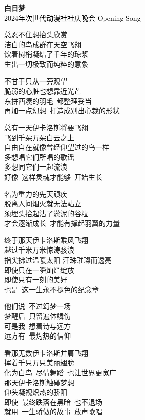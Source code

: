 \newpage  %
\vspace{3em}
\begin{center}
    \fontsize{25pt}{27pt}\selectfont
    \textbf{\textcolor{truepurple}{白日梦}}  %
    \\[0ex]  %
    \fontsize{15pt}{17pt}\selectfont
    \textcolor{black}{2024年次世代动漫社社庆晚会 Opening Song}  %
\end{center}
\flushleft  %
\vspace{2em}
\begin{multicols}{2} 
总忍不住想抬头欣赏\\
洁白的鸟成群在天空飞翔\\
饮着树梢凝结了千年的琼浆\\
生出一切极致而纯粹的意象

\vspace{1em}
不甘于只从一旁观望\\
脆弱的心脏也想靠近光芒\\
东拼西凑的羽毛~都整理妥当\\
再加一点幻想~打造成别出心裁的形状

\vspace{1em}
总有一天伊卡洛斯将要飞翔\\
飞到千朵万朵白云之上\\
自由自在就像曾经仰望过的鸟一样\\
多想唱它们所唱的歌谣\\
多想同它们一起流浪\\
好像~这样灵魂才能够~开始生长 

\vspace{1em}
名为重力的先天顽疾\\
脱离人间烟火就无法站立\\
须埋头拾起沾了淤泥的谷粒\\
才会逐渐成长~才能有撑起羽翼的力量

\vspace{1em}
终于那天伊卡洛斯乘风飞翔\\
越过千米万米惊涛骇浪\\
指尖拂过温暖太阳 汗珠璀璨而透亮\\
即使只在一瞬灿烂绽放\\
即使只有一刻的美好\\
也是~这一生永不褪色的纪念章

\vspace{1em}
他们说~不过幻梦一场\\
梦醒后~只留遍体鳞伤\\
可是我~想着诗与远方\\
远方有~最灼热的信仰

\vspace{1em}
看那无数伊卡洛斯并肩飞翔\\
挥着千只万只美丽翅膀\\
化为白鸟~尽情舞蹈~也让世界更宽广\\
那天伊卡洛斯触碰梦想\\
仰头凝视炽热的骄阳\\
即使~最终跌落在黑暗~也不退场\\
就用~一生骄傲的故事~放声歌唱
\end{multicols}